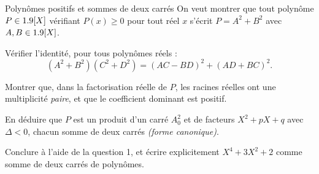 \begin{exercice}[3]{Polynômes positifs et sommes de deux carrés}
On veut montrer que tout polynôme $P\in1.9[X]$ vérifiant $P(x)\geq0$ pour
tout réel $x$ s'écrit $P=A^{2}+B^{2}$ avec $A,B\in1.9[X]$.
\begin{questions}
  \item Vérifier l'identité, pour tous polynômes réels :
    \[
      (A^{2}+B^{2})(C^{2}+D^{2})=(AC-BD)^{2}+(AD+BC)^{2}.
    \]
  \item Montrer que, dans la factorisation réelle de $P$, les racines
    réelles ont une multiplicité \emph{paire}, et que le coefficient
    dominant est positif.
  \item En déduire que $P$ est un produit d'un carré $A_0^{2}$ et de
    facteurs $X^{2}+pX+q$ avec $\Delta<0$, chacun somme de deux carrés
    \emph{(forme canonique)}.
  \item Conclure à l'aide de la question 1, et écrire explicitement
    $X^{4}+3X^{2}+2$ comme somme de deux carrés de polynômes.
\end{questions}
\end{exercice}


